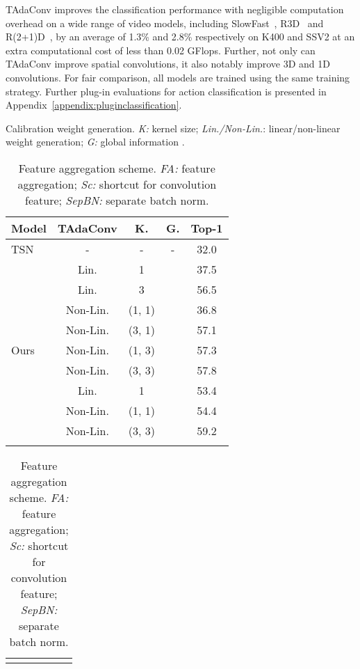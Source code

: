 \documentclass{article} \usepackage{iclr2022_conference,times}
\newcommand{\cmark}{\color{forestgreen}\ding{51}}\newcommand{\xmark}{\color{red}\ding{55}}\usepackage{pifont}
\newcommand{\tablestyle}[2]{\setlength{\tabcolsep}{#1}\renewcommand{\arraystretch}{#2}\centering\small}
\begin{document}
TAdaConv improves the classification performance
with negligible computation overhead on a wide range of video models, including SlowFast~\citep{slowfast}, R3D~\citep{retrace} and R(2+1)D~\citep{r21d}, by an average of 1.3\% and 2.8\% respectively on K400 and SSV2 at an extra computational cost of less than 0.02 GFlops.
Further, not only can TAdaConv improve spatial convolutions, it also notably improve 3D and 1D convolutions.
For fair comparison, all models are trained using the same training strategy. 
Further plug-in evaluations for action classification is presented in Appendix~\ref{appendix:pluginclassification}.
\begin{table}[]
\begin{minipage}[t]{0.46\textwidth}
\centering
    \tablestyle{4pt}{1.0}
    \caption{Calibration weight generation.
\textit{K:} kernel size; \textit{Lin./Non-Lin.}: linear/non-linear weight generation; \textit{G:} global information .}
\vspace{-2mm}
\begin{tabular}{lcccc}
\shline
\bf Model & \bf TAdaConv & \bf K. & \bf G. & \bf Top-1\\
\hline
TSN & - & - & - & 32.0 \\
\hline
\multirow{9}{*}{Ours} & Lin. & 1 & \xmark & 37.5 \\
~ & Lin. & 3 & \xmark & 56.5 \\
\cline{2-5}
~ & Non-Lin. & (1, 1) & \xmark & 36.8\\
~ & Non-Lin. & (3, 1) & \xmark & 57.1\\
~ & Non-Lin. & (1, 3) & \xmark & 57.3\\
~ & Non-Lin. & (3, 3) & \xmark & 57.8\\
\cline{2-5}
~ & Lin. & 1 & \cmark & 53.4 \\
~ & Non-Lin. & (1, 1) & \cmark & 54.4\\
~ & Non-Lin. & (3, 3) & \cmark & 59.2\\
\shline
\end{tabular}
\label{tab:calibrationweightgen}
\end{minipage}
\hspace{2mm}
\begin{minipage}[t]{0.46\textwidth}
\centering
    \tablestyle{3pt}{1.0}
    \caption{Feature aggregation scheme.
\textit{FA:} feature aggregation; \textit{Sc:} shortcut for convolution feature; \textit{SepBN:} separate batch norm.}
\vspace{-2mm}
\begin{tabular}{cccccc}
\shline

\end{tabular}
\end{minipage}
\end{table}
\end{document}
